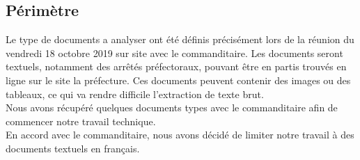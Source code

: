\subsection {Périmètre}
Le type de documents a analyser ont été définis précisément lors de la réunion du vendredi 18 octobre 2019 sur site avec le commanditaire.
Les documents seront textuels, notamment des arrêtés préfectoraux, pouvant être en partis trouvés en ligne sur le site la préfecture.
Ces documents peuvent contenir des images ou des tableaux, ce qui va rendre difficile l'extraction de texte brut.
\\
Nous avons récupéré quelques documents types avec le commanditaire afin de commencer notre travail technique.
\\
En accord avec le commanditaire, nous avons décidé de limiter notre travail à des documents textuels en français.







